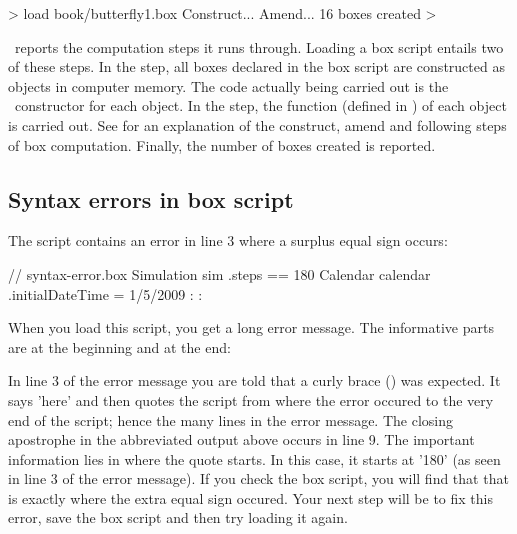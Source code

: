 \begin{usdialog}
> load book/butterfly1.box
Construct...
Amend...
16 boxes created
> 
\end{usdialog}

\US\ reports the computation steps it runs through. Loading a box script entails two of these steps. In the  step, all boxes declared in the box script are constructed as objects in computer memory. The code actually being carried out is the \CPP\ constructor for each object. In the  step, the  function (defined in \CPP) of each object is carried out. See  for an explanation of the construct, amend and following steps of box computation. Finally, the number of boxes created is reported.

\subsection{Syntax errors in box script}
The  script contains an error in line 3 where a surplus equal sign occurs:

\lstset{numbers=left}
\begin{boxscript}
// syntax-error.box
Simulation sim {
  .steps == 180
  Calendar calendar {
    .initialDateTime = 1/5/2009
  }
:
:
}
\end{boxscript}
\lstset{numbers=none}

When you load this script, you get a long error message. The informative parts are at the beginning and at the end:

\lstset{numbers=left}
\begin{userror}
> load book/syntax-error.box
Error! Expecting "}" here: "180
  Calendar calendar {
    .initialDateTime = 1/5/2009
  }
:
:
"
Parse failure
Load failed
Error: Construction failed
Source code: ..\..\..\..\UniSim2\src\plugins\%\brk%
>
\end{userror}
\lstset{numbers=none}

In line 3 of the error message you are told that a curly brace (\code{\}}) was expected. It says 'here' and then quotes the script from where the error occured to the very end of the script; hence the many lines in the error message. The closing apostrophe in the abbreviated output above occurs in line 9. The important information lies in where the quote starts. In this case, it starts at '180' (as seen in line 3 of the error message). If you check the box script, you will find that that is exactly where the extra equal sign occured. Your next step will be to fix this error, save the box script and then try loading it again.

